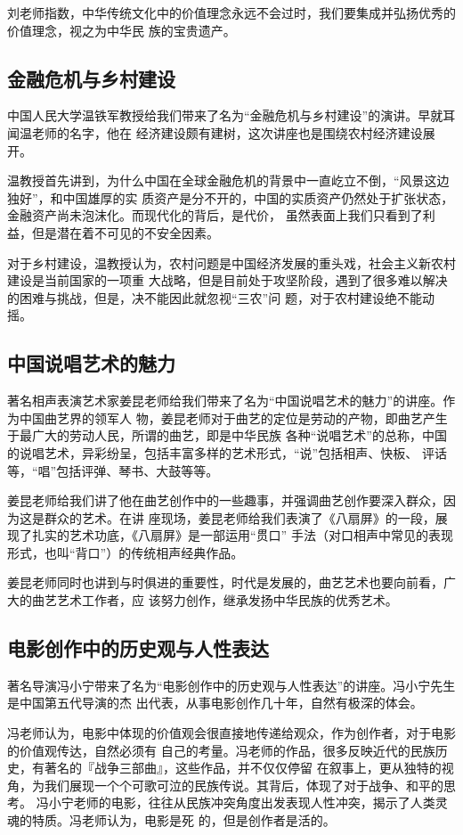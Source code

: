 \documentclass[a4paper]{cctart}
\numberwithin{equation}{section} \pagestyle{fancy}
\begin{document}
刘老师指数，中华传统文化中的价值理念永远不会过时，我们要集成并弘扬优秀的价值理念，视之为中华民
族的宝贵遗产。

\subsection{金融危机与乡村建设}
中国人民大学温铁军教授给我们带来了名为“金融危机与乡村建设”的演讲。早就耳闻温老师的名字，他在
经济建设颇有建树，这次讲座也是围绕农村经济建设展开。

温教授首先讲到，为什么中国在全球金融危机的背景中一直屹立不倒，“风景这边独好”，和中国雄厚的实
质资产是分不开的，中国的实质资产仍然处于扩张状态，金融资产尚未泡沫化。而现代化的背后，是代价，
虽然表面上我们只看到了利益，但是潜在着不可见的不安全因素。

对于乡村建设，温教授认为，农村问题是中国经济发展的重头戏，社会主义新农村建设是当前国家的一项重
大战略，但是目前处于攻坚阶段，遇到了很多难以解决的困难与挑战，但是，决不能因此就忽视“三农”问
题，对于农村建设绝不能动摇。
\subsection{中国说唱艺术的魅力}
著名相声表演艺术家姜昆老师给我们带来了名为“中国说唱艺术的魅力”的讲座。作为中国曲艺界的领军人
物，姜昆老师对于曲艺的定位是劳动的产物，即曲艺产生于最广大的劳动人民，所谓的曲艺，即是中华民族
各种“说唱艺术”的总称，中国的说唱艺术，异彩纷呈，包括丰富多样的艺术形式，“说”包括相声、快板、
评话等，“唱”包括评弹、琴书、大鼓等等。

姜昆老师给我们讲了他在曲艺创作中的一些趣事，并强调曲艺创作要深入群众，因为这是群众的艺术。在讲
座现场，姜昆老师给我们表演了《八扇屏》的一段，展现了扎实的艺术功底，《八扇屏》是一部运用“贯口”
手法（对口相声中常见的表现形式，也叫“背口”）的传统相声经典作品。

姜昆老师同时也讲到与时俱进的重要性，时代是发展的，曲艺艺术也要向前看，广大的曲艺艺术工作者，应
该努力创作，继承发扬中华民族的优秀艺术。
\subsection{电影创作中的历史观与人性表达}
著名导演冯小宁带来了名为“电影创作中的历史观与人性表达”的讲座。冯小宁先生是中国第五代导演的杰
出代表，从事电影创作几十年，自然有极深的体会。

冯老师认为，电影中体现的价值观会很直接地传递给观众，作为创作者，对于电影的价值观传达，自然必须有
自己的考量。冯老师的作品，很多反映近代的民族历史，有著名的『战争三部曲』，这些作品，并不仅仅停留
在叙事上，更从独特的视角，为我们展现一个个可歌可泣的民族传说。其背后，体现了对于战争、和平的思考。
冯小宁老师的电影，往往从民族冲突角度出发表现人性冲突，揭示了人类灵魂的特质。冯老师认为，电影是死
的，但是创作者是活的。
\end{document}
